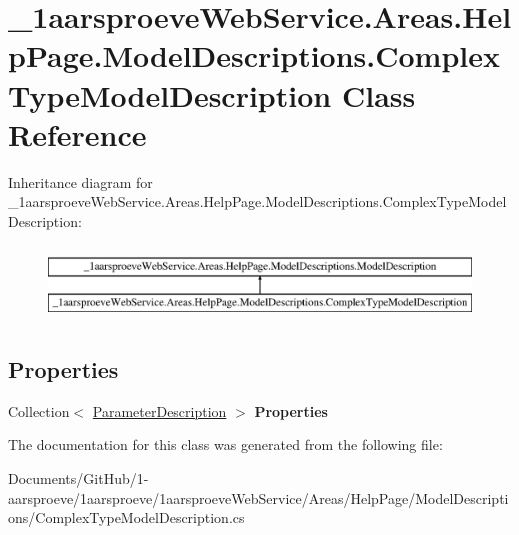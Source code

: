 \hypertarget{class__1aarsproeve_web_service_1_1_areas_1_1_help_page_1_1_model_descriptions_1_1_complex_type_model_description}{}\section{\+\_\+1aarsproeve\+Web\+Service.\+Areas.\+Help\+Page.\+Model\+Descriptions.\+Complex\+Type\+Model\+Description Class Reference}
\label{class__1aarsproeve_web_service_1_1_areas_1_1_help_page_1_1_model_descriptions_1_1_complex_type_model_description}
Inheritance diagram for \+\_\+1aarsproeve\+Web\+Service.\+Areas.\+Help\+Page.\+Model\+Descriptions.\+Complex\+Type\+Model\+Description\+:\begin{figure}[H]
\begin{center}
\leavevmode
\includegraphics[height=2.000000cm]{class__1aarsproeve_web_service_1_1_areas_1_1_help_page_1_1_model_descriptions_1_1_complex_type_model_description}
\end{center}
\end{figure}
\subsection*{Properties}
\begin{DoxyCompactItemize}
\item 
\hypertarget{class__1aarsproeve_web_service_1_1_areas_1_1_help_page_1_1_model_descriptions_1_1_complex_type_model_description_afabdec8e2987c716ec40a6d32410fca9}{}Collection$<$ \hyperlink{class__1aarsproeve_web_service_1_1_areas_1_1_help_page_1_1_model_descriptions_1_1_parameter_description}{Parameter\+Description} $>$ {\bfseries Properties}\label{class__1aarsproeve_web_service_1_1_areas_1_1_help_page_1_1_model_descriptions_1_1_complex_type_model_description_afabdec8e2987c716ec40a6d32410fca9}

\end{DoxyCompactItemize}


The documentation for this class was generated from the following file\+:\begin{DoxyCompactItemize}
\item 
Documents/\+Git\+Hub/1-\/aarsproeve/1aarsproeve/1aarsproeve\+Web\+Service/\+Areas/\+Help\+Page/\+Model\+Descriptions/Complex\+Type\+Model\+Description.\+cs\end{DoxyCompactItemize}
